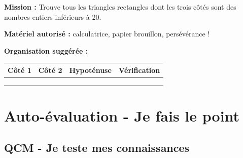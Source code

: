 \begin{exercisebox}
	\textbf{Mission :} Trouve tous les triangles rectangles dont les trois côtés sont des nombres entiers inférieurs à 20.
	
	\vspace{0.3cm}
	\textbf{Matériel autorisé :} calculatrice, papier brouillon, persévérance !
	
	\vspace{0.3cm}
	\textbf{Organisation suggérée :}
	\begin{center}
		\begin{tabular}{|c|c|c|c|}
			\hline
			\textbf{Côté 1} & \textbf{Côté 2} & \textbf{Hypoténuse} & \textbf{Vérification} \\
			\hline
			& & & \\
			\hline
			& & & \\
			\hline
			& & & \\
			\hline
		\end{tabular}
	\end{center}
\end{exercisebox}

\section{Auto-évaluation - Je fais le point}

\subsection*{QCM - Je teste mes connaissances}

